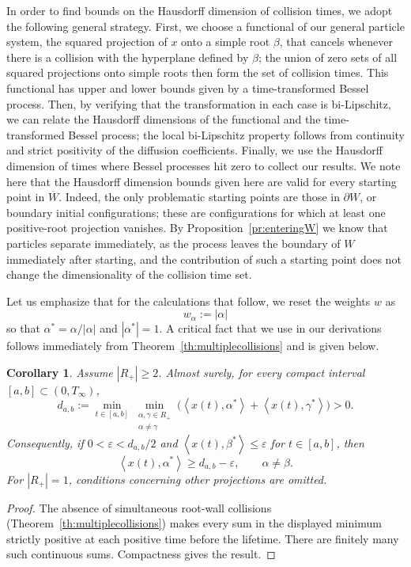 \documentclass{article}
\numberwithin{equation}{section}
\newcommand{\C}{W}
\newcommand{\Cc}{\overline{W}}
\newcommand{\Cb}{\partial \C}
\newcommand{\xtas}{\left<x(t),\alpha^*\right>}
\newcommand{\xtbs}{\left<x(t),\beta^*\right>}
\newcommand{\xtcs}{\left<x(t),\gamma^*\right>}
\theoremstyle{plain}
\newtheorem{corollary}[theorem]{Corollary}
\begin{document}
In order to find bounds on the Hausdorff dimension of collision times, we adopt the following general strategy. First, we choose a functional of our general particle system, the squared projection of $x$ onto a simple root $\beta$, that cancels whenever there is a collision with the hyperplane defined by $\beta$; the union of zero sets of all squared projections onto simple roots then form the set of collision times. This functional has upper and lower bounds given by a time-transformed Bessel process. Then, by verifying that the transformation in each case is bi-Lipschitz, we can relate the Hausdorff dimensions of the functional and the time-transformed Bessel process; the local bi-Lipschitz property follows from continuity and strict positivity of the diffusion coefficients. Finally, we use the Hausdorff dimension of times where Bessel processes hit zero to collect our results. We note here that the Hausdorff dimension bounds given here are valid for every starting point in $\Cc$. Indeed, the only problematic starting points are those in $\Cb$, or boundary initial configurations; these are configurations for which at least one positive-root projection vanishes. By Proposition~\ref{pr:enteringW} we know that particles separate immediately, as the process leaves the boundary of $\C$ immediately after starting, and the contribution of such a starting point does not change the dimensionality of the collision time set.

Let us emphasize that for the calculations that follow, we reset the weights $w$ as
        \[w_\alpha:=|\alpha|\]
so that $\alpha^*=\alpha/|\alpha|$ and $|\alpha^*|=1$. A critical fact that we use in our derivations follows immediately from Theorem~\ref{th:multiplecollisions} and is given below.
\begin{corollary}\label{cor:projectiondistance}
Assume $|R_+|\geq2$. Almost surely, for every compact interval $[a,b]\subset(0,T_\infty)$,
\[
 d_{a,b}:=\min_{t\in[a,b]}
 \min_{\substack{\alpha,\gamma\in R_+\\\alpha\ne\gamma}}
 \bigl(\xtas+\xtcs\bigr)>0.
\]
Consequently, if $0<\varepsilon<d_{a,b}/2$ and
$\xtbs\leq\varepsilon$ for $t\in[a,b]$, then
\[
 \xtas\geq d_{a,b}-\varepsilon,
 \qquad \alpha\ne\beta.
\]
For $|R_+|=1$, conditions concerning other projections are omitted.
\end{corollary}
\begin{proof}
    The absence of simultaneous root-wall collisions (Theorem~\ref{th:multiplecollisions}) makes every sum in the displayed minimum strictly positive at each positive time before the lifetime. There are finitely many such continuous sums. Compactness gives the result.
\end{proof}
\end{document}
